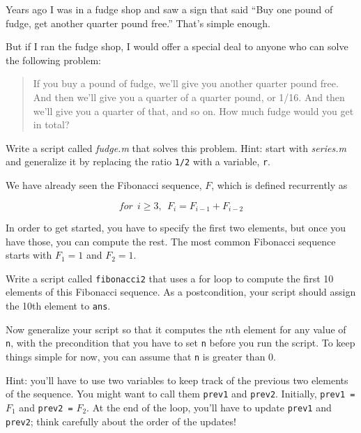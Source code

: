 \begin{ex}
Years ago I was in a fudge shop and saw a sign that said ``Buy one pound of fudge, get another quarter pound free.''  That's simple enough.

But if I ran the fudge shop, I would offer a special deal to anyone who can solve the following problem:

\begin{quote}
If you buy a pound of fudge, we'll give you another quarter pound free.  And then we'll give you a quarter of a quarter pound, or 1/16.  And then we'll give you a quarter of that, and so on.  How much fudge would you get in total?
\end{quote}

Write a script called {\em fudge.m} that solves this problem.  Hint: start with {\em series.m} and generalize it by replacing the ratio {\tt 1/2} with a variable, {\tt r}.

\end{ex}



\begin{ex}
\label{fib2}

We have already seen the Fibonacci sequence, $F$, which
is defined recurrently as

\[ for~~i \ge 3, ~~  F_{i} = F_{i-1} + F_{i-2} \]

In order to get started, you have to specify the first two
elements, but once you have those, you can compute the rest.
The most common Fibonacci sequence starts with $F_1 = 1$ and $F_2 = 1$.

Write a script called {\tt fibonacci2} that uses a for loop
to compute the first 10 elements of this Fibonacci sequence.
As a postcondition, your script should assign the 10th element to
{\tt ans}.

Now generalize your script so that it computes the $n$th element
for any value of {\tt n}, with the precondition that you have to
set {\tt n} before you run the script.  To keep things simple for
now, you can assume that {\tt n} is greater than 0.

Hint: you'll have to use two variables to keep track of the
previous two elements of the sequence.  You might want to call
them {\tt prev1} and {\tt prev2}.  Initially, {\tt prev1 =} $F_1$
and {\tt prev2 =} $F_2$.  At the end of the loop, you'll have
to update {\tt prev1} and {\tt prev2}; think carefully about the
order of the updates!
\end{ex}

